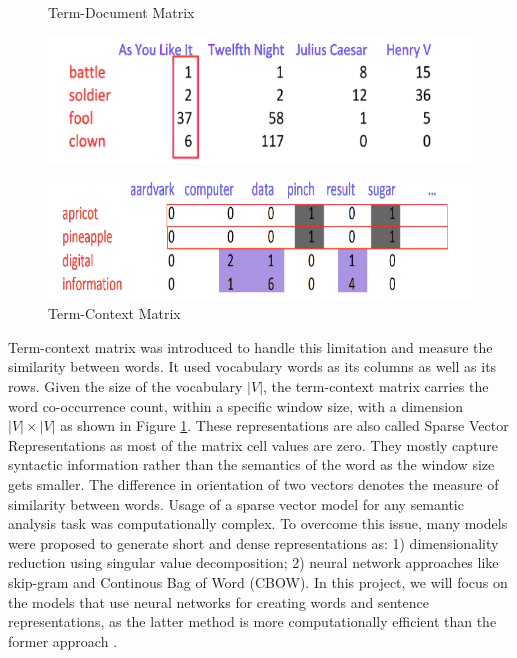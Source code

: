 \documentclass[12pt]{report} %
\begin{document}
\begin{figure}[!tbp]
	\centering
	\begin{minipage}[b]{0.47\textwidth}
		\centering
		\caption{ Term-Document Matrix}
		\label{doc-word}
		\includegraphics[scale=0.30]{image/doc-word.png}
	\end{minipage}
	\begin{minipage}[b]{0.47\textwidth}
		\centering
		\caption{Term-Context Matrix}
		\label{word-word}
		\includegraphics[scale=0.30]{image/word-word.png}    
	\end{minipage}
\end{figure}

Term-context matrix was introduced to handle this limitation and measure the similarity between words.  It used vocabulary words as its columns as well as its rows. Given the size of the vocabulary $|V|$, the term-context matrix carries the word co-occurrence count, within a specific window size,  with a dimension $|V| \times |V|$ as shown in Figure \ref{word-word}. These representations are also called Sparse Vector Representations as most of the matrix cell values are zero. They mostly capture syntactic information rather than the semantics of the word as the window size gets smaller. The difference in orientation of two vectors denotes the measure of similarity between words. Usage of a sparse vector model for any semantic analysis task was computationally complex. To overcome this issue, many models were proposed to generate short and dense representations as: 1) dimensionality reduction using singular value decomposition; 2) neural network approaches like skip-gram and Continous Bag of Word (CBOW). In this project, we will focus on the models that use neural networks for creating words and sentence representations, as the latter method is more computationally efficient than the former approach \citep{jurafsky2014speech}.
\end{document}
